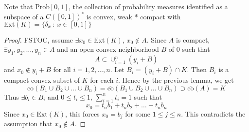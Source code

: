 Note that $\textrm{Prob}[0, 1]$, the collection of probability measures identified as a subspace of a $C([0, 1])^*$ is convex, weak * compact with $\textrm{Ext}(K) = \{ \delta_x  \ : \  x \in [0, 1] \}$
\begin{proof}
  FSTOC, assume $\exists x_0 \in \textrm{Ext}(K)$, $x_0 \not \in A$. Since $A$ is compact, $\exists y_1 , y_2 , \ldots , y_n \in A$ and an open convex neighborhood $B$ of $0$ such that $$A \subset \cup_{i = 1}^{n}(y_i + B)$$
  and $x_0 \not\in y_i + \overline{B}$ for all $i = 1, 2, \ldots, n$. Let $B_i = (y_i + \overline{B}) \cap K$. Then $B_i$ is a compact convex subset of $K$ for each $i$. Hence by the previous lemma, we get \[
    \textrm{co}(B_1 \cup B_2 \cup \ldots \cup B_n) = \overline{\textrm{co}}(B_1 \cup B_2 \cup \ldots \cup B_n) \supset \overline{\textrm{co}}(A) = K
  \]
  Thus $\exists b_i \in B_i$ and $0 \le t_i \le 1$, $\sum_{i = 1}^{n} t_i = 1$ such that \[
    x_0 = t_n b_1 + t_n b_2 + \ldots + t_n b_n
  \]
  Since $x_0 \in \textrm{Ext}(K)$, this forces $x_0 = b_j$ for some $1 \le j \le n$. This contradicts the assumption that $x_0 \not\in A$.
\end{proof}


